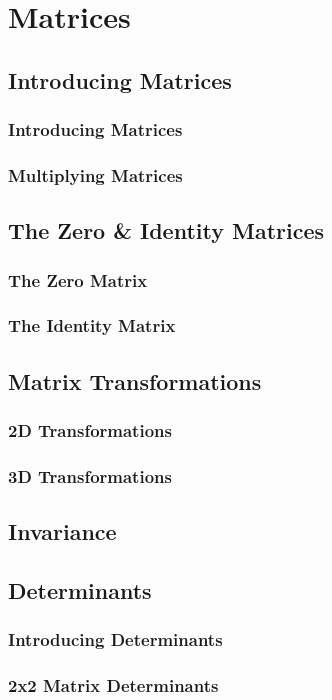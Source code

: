 \documentclass[../alevelmaths.tex]{subfiles}
\begin{document}
\chapter{Matrices}
\section{Introducing Matrices}
\subsection*{Introducing Matrices}
\subsection*{Multiplying Matrices}
\section{The Zero \& Identity Matrices}
\subsection*{The Zero Matrix}
\subsection*{The Identity Matrix}
\section{Matrix Transformations}
\subsection*{2D Transformations}
\subsection*{3D Transformations}
\section{Invariance}
\section{Determinants}
\subsection*{Introducing Determinants}
\subsection*{2x2 Matrix Determinants}
\end{document}

